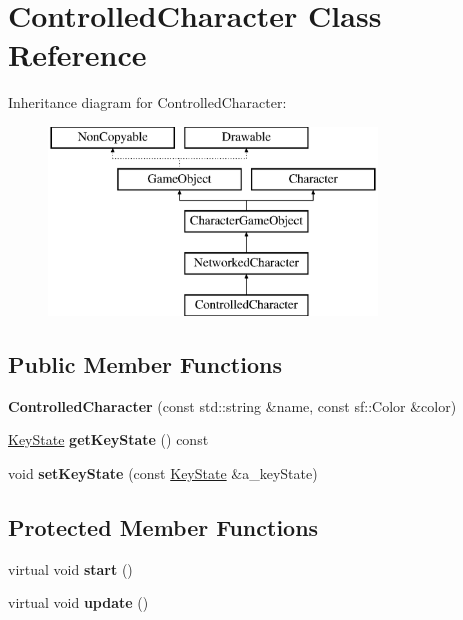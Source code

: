\hypertarget{class_controlled_character}{\section{Controlled\-Character Class Reference}
\label{class_controlled_character}
}
Inheritance diagram for Controlled\-Character\-:\begin{figure}[H]
\begin{center}
\leavevmode
\includegraphics[height=5.000000cm]{class_controlled_character}
\end{center}
\end{figure}
\subsection*{Public Member Functions}
\begin{DoxyCompactItemize}
\item 
\hypertarget{class_controlled_character_ae1733b6dde703cf779b696671b1d6d46}{{\bfseries Controlled\-Character} (const std\-::string \&name, const sf\-::\-Color \&color)}\label{class_controlled_character_ae1733b6dde703cf779b696671b1d6d46}

\item 
\hypertarget{class_controlled_character_a234f336f78643cf9175a7b39d1582c2d}{\hyperlink{class_key_state}{Key\-State} {\bfseries get\-Key\-State} () const }\label{class_controlled_character_a234f336f78643cf9175a7b39d1582c2d}

\item 
\hypertarget{class_controlled_character_abfcca4810e477f4270a62c086a60f639}{void {\bfseries set\-Key\-State} (const \hyperlink{class_key_state}{Key\-State} \&a\-\_\-key\-State)}\label{class_controlled_character_abfcca4810e477f4270a62c086a60f639}

\end{DoxyCompactItemize}
\subsection*{Protected Member Functions}
\begin{DoxyCompactItemize}
\item 
\hypertarget{class_controlled_character_a8d7919066adeb097994fb109d554eded}{virtual void {\bfseries start} ()}\label{class_controlled_character_a8d7919066adeb097994fb109d554eded}

\item 
\hypertarget{class_controlled_character_a83d083710dde7af78186c32ace3efb0b}{virtual void {\bfseries update} ()}\label{class_controlled_character_a83d083710dde7af78186c32ace3efb0b}

\end{DoxyCompactItemize}
